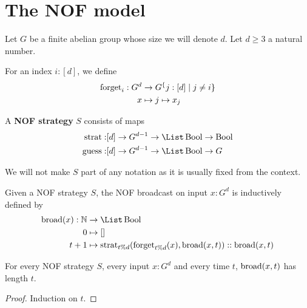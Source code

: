 \chapter{The NOF model}

Let $G$ be a finite abelian group whose size we will denote $d$. Let $d \ge 3$ a natural number.

\begin{definition}
  \label{def:forget}
  \leanok

  For an index $i : [d]$, we define
  \begin{align}
    \operatorname{forget}_i : G^d & \to G^\{j : [d] \mid j \ne i\} \\
    x & \mapsto j \mapsto x_j
  \end{align}
\end{definition}

\begin{definition}
  \label{def:strategy}
  \leanok

  A {\bf NOF strategy} $S$ consists of maps
  \begin{align}
    \strat : & [d] \to G^{d - 1} \to \List \Bool \to \Bool \\
    \guess : & [d] \to G^{d - 1} \to \List \Bool \to G
  \end{align}
\end{definition}

We will not make $S$ part of any notation as it is usually fixed from the context.

\begin{definition}
  \label{def:broadcast}
  \leanok

  Given a NOF strategy $S$, the NOF broadcast on input $x : G^d$ is inductively defined by
  \begin{align}
    \broad(x) : \N & \to \List \Bool \\
    0 & \mapsto [] \\
    t + 1 & \mapsto \strat_{t \% d}(\forget_{t \% d}(x), \broad(x, t)) :: \broad(x, t)
  \end{align}
\end{definition}

\begin{lemma}
  \label{lem:length-broadcast}
  \leanok

  For every NOF strategy $S$, every input $x : G^d$ and every time $t$, $\operatorname{broad}(x, t)$ has length $t$.
\end{lemma}
\begin{proof}

  Induction on $t$.
\end{proof}

